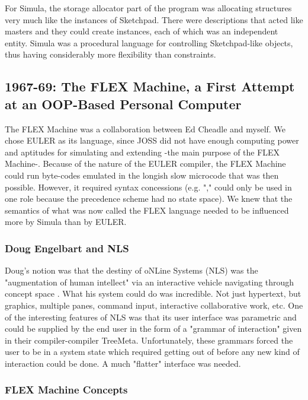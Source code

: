 \documentclass[letterpaper,12pt,parskip=full]{article}
\begin{document}
For Simula, the storage allocator part of the program was allocating structures very much like the instances of Sketchpad. There were descriptions that acted like masters and they could create instances, each of which was an independent entity. Simula was a procedural language for controlling Sketchpad-like objects, thus having considerably more flexibility than constraints.

\subsection{1967-69: The FLEX Machine, a First Attempt at an OOP-Based Personal Computer}

The FLEX Machine was a collaboration between Ed Cheadle and myself. We chose EULER as its language, since JOSS did not have enough computing power and aptitudes for simulating and extending -the main purpose of the FLEX Machine-. Because of the nature of the EULER compiler, the FLEX Machine could run byte-codes emulated in the longish slow microcode that was then possible. However, it required syntax concessions (e.g. "," could only be used in one role because the precedence scheme had no state space). We knew that the semantics of what was now called the FLEX language needed to be influenced more by Simula than by EULER.

\subsubsection{Doug Engelbart and NLS}

Doug's notion was that the destiny of oNLine Systems (NLS) was the "augmentation of human intellect" via an interactive vehicle navigating through concept space . What his system could do was incredible. Not just hypertext, but graphics, multiple panes, command input, interactive collaborative work, etc. One of the interesting features of NLS was that its user interface was parametric and could be supplied by the end user in the form of a "grammar of interaction" given in their compiler-compiler TreeMeta. Unfortunately, these grammars forced the user to be in a system state which required getting out of before any new kind of interaction could be done. A much "flatter" interface was needed.

\subsubsection{FLEX Machine Concepts}
\end{document}

